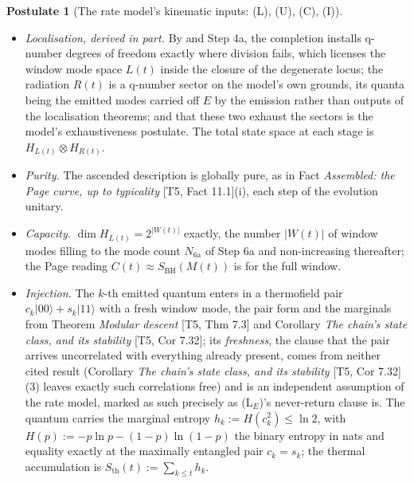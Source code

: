 \documentclass[11pt]{article}
\theoremstyle{definition}
\newtheorem{postulate}[theorem]{Postulate}
\theoremstyle{plain}
\providecommand{\Sth}{}\renewcommand{\Sth}{S_{\mathrm{th}}}
\begin{document}
\begin{postulate}[The rate model's kinematic inputs: (L), (U), (C), (I)]\label{c:singularity.rate-models-kinematic-inputs-l-u}
\leavevmode
\begin{itemize}
\item[(L)] \emph{Localisation, derived in part.} By \cite[Thm.~4.4, Cor.~4.5, Thms 8.7, 8.12]{ButlerT4} and Step 4a, the completion installs q-number degrees of freedom exactly where division fails, which licenses the window mode space $L(t)$ inside the closure of the degenerate locus; the radiation $R(t)$ is a q-number sector on the model's own grounds, its quanta being the emitted modes carried off $E$ by the emission rather than outputs of the localisation theorems; and that these two exhaust the sectors is the model's exhaustiveness postulate. The total state space at each stage is $H_{L(t)} \otimes H_{R(t)}$.
\item[(U)] \emph{Purity.} The ascended description is globally pure, as in Fact \emph{Assembled: the Page curve, up to typicality} [T5, Fact 11.1](i), each step of the evolution unitary.
\item[(C)] \emph{Capacity.} $\dim H_{L(t)} = 2^{|W(t)|}$ exactly, the number $|W(t)|$ of window modes filling to the mode count $N_{\mathrm{6a}}$ of Step 6a and non-increasing thereafter; the Page reading $C(t) \approx S_{\mathrm{BH}}(M(t))$ is for the full window.
\item[(I)] \emph{Injection.} The $k$-th emitted quantum enters in a thermofield pair $c_k|00\rangle + s_k|11\rangle$ with a fresh window mode, the pair form and the marginals from Theorem \emph{Modular descent} [T5, Thm 7.3] and Corollary \emph{The chain's state class, and its stability} [T5, Cor 7.32]; its \emph{freshness}, the clause that the pair arrives uncorrelated with everything already present, comes from neither cited result (Corollary \emph{The chain's state class, and its stability} [T5, Cor 7.32](3) leaves exactly such correlations free) and is an independent assumption of the rate model, marked as such precisely as (L$_E$)'s never-return clause is. The quantum carries the marginal entropy $h_k := H(c_k^{2}) \leq \ln 2$, with $H(p) := -p\ln p - (1-p)\ln(1-p)$ the binary entropy in nats and equality exactly at the maximally entangled pair $c_k = s_k$; the thermal accumulation is $\Sth(t) := \sum_{k \leq t} h_k$.
\end{itemize}
\end{postulate}
\end{document}
